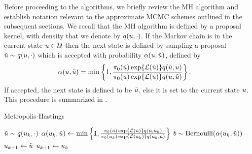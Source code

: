 \documentclass[12pt]{article}
\begin{document}
Before proceeding to the algorithms, we briefly review the MH algorithm and establish notation relevant to the 
approximate MCMC schemes outlined in the subsequent sections. 
We recall that the MH algorithm is defined by a proposal kernel, with density that we denote by 
$\propDens(\Par, \cdot)$. If the Markov chain is in the current state $\Par \in \parSpace$ then 
the next state is defined by sampling a proposal $\propPar \sim \propDens(\Par, \cdot)$ which is 
accepted with probability $\accProbMH(\Par, \propPar)$, defined by 
\begin{align}
&\accProbMH(\Par, \propPar) = 
\min\left\{1, \frac{\priorDens(\propPar) \Exp{\llik(\propPar)} \propDens(\propPar, \Par)}{\priorDens(\Par) \Exp{\llik(\Par)} \propDens(\Par, \propPar)} \right\}.
\label{MH_acc_prob_exact}
\end{align}
If accepted, the next state is defined to be $\propPar$, else it is set to the current state $\Par$. 
This procedure is summarized in . 
\begin{algorithm}
    \caption{Metropolis-Hastings}
    \label{alg:MH}
    \begin{algorithmic}[1] %
        		\State $\propPar \sim \propDens(\indexMCMC{\Par}, \cdot)$ 
		\State $\accProbMH(\indexMCMC{\Par}, \propPar) \gets \min\left\{1, \frac{\priorDens(\propPar)\Exp{\llik(\propPar)}
				\propDens(\propPar, \indexMCMC{\Par})}{\priorDens(\indexMCMC{\Par}) \Exp{\llik(\indexMCMC{\Par})}  \propDens(\indexMCMC{\Par}, \propPar)} \right\}$
		\State $b \sim \text{Bernoulli}(\accProbMH(\indexMCMC{\Par}, \propPar))$
			\State $\indexMCMC[\mcmcIndex+1]{\Par} \gets \propPar$ 
		\Else
			\State $\indexMCMC[\mcmcIndex+1]{\Par} \gets \indexMCMC{\Par}$
		\EndIf
	\EndFor
	\EndFunction
    \end{algorithmic}
\end{algorithm}
\end{document}
